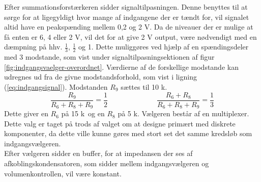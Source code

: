 Efter summationsforstærkeren sidder signaltilpasningen. Denne benyttes til at sørge for at ligegyldigt hvor mange af indgangene der er tændt for, vil signalet altid have en peakspænding mellem 0,2 og 2 V. Da de niveauer der er mulige at få enten er 6, 4 eller 2 V, vil det for at give 2 V output, være nødvendigt med en dæmpning på hhv. $\frac{1}{3}$, $\frac{1}{2}$ og 1. Dette muliggøres ved hjælp af en spændingsdeler med 3 modstande, som vist under signaltilpasningsektionen af figur \ref{fig:indgangsvaelger-overordnet}. Værdierne af de forskellige modstande kan udregnes ud fra de givne modstandsforhold, som vist i ligning (\ref{eq:indgangsignal}). Modstanden $R_9$ sættes til 10 k\ohm.
\begin{equation}
\label{eq:indgangsignal}
\frac{R_9}{R_6+R_8+R_9}=\frac{1}{2} \;\;\;\;\;\;\;\;\;\;\;\;~~~~~~~~~~~~~~~~
\frac{R_6+R_8}{R_6+R_8+R_9}=\frac{1}{3}
\end{equation}
Dette giver en $R_6$ på 15 k\ohm~og en $R_8$ på 5 k\ohm.
Vælgeren består af en multiplexer. Dette valg er taget på trods af valget om at designe primært med diskrete komponenter, da dette ville kunne gøres med stort set det samme kredsløb som indgangsvælgeren. \\Efter vælgeren sidder en buffer, for at impedansen der ses af afkoblingskondensatoren, som sidder mellem indgangsvælgeren og volumenkontrollen, vil være konstant.
